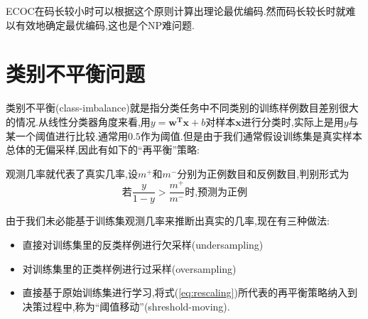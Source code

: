 ECOC在码长较小时可以根据这个原则计算出理论最优编码.然而码长较长时就难以有效地确定最优编码,这也是个NP难问题.

\section{类别不平衡问题}

类别不平衡(class-imbalance)就是指分类任务中不同类别的训练样例数目差别很大的情况.从线性分类器角度来看,用$y=\mathbf{w^Tx}+b$对样本$\mathbf x$进行分类时,实际上是用$y$与某一个阈值进行比较.通常用$0.5$作为阈值.但是由于我们通常假设训练集是真实样本总体的无偏采样,因此有如下的``再平衡''策略:

观测几率就代表了真实几率,设$m^+$和$m^-$分别为正例数目和反例数目,判别形式为
\begin{equation}\label{eq:rescaling}
\text{若}\frac{y}{1-y}>\frac{m^+}{m^-}\text{时,预测为正例}
\end{equation}

由于我们未必能基于训练集观测几率来推断出真实的几率,现在有三种做法:
\begin{itemize}
\item 直接对训练集里的反类样例进行欠采样(undersampling)
\item 对训练集里的正类样例进行过采样(oversampling)
\item 直接基于原始训练集进行学习,将式(\ref{eq:rescaling})所代表的再平衡策略纳入到决策过程中,称为``阈值移动''(shreshold-moving).
\end{itemize}